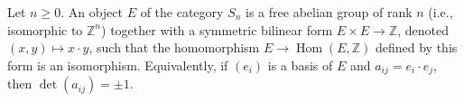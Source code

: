 Let $n \geq 0$. An object $E$ of the category $S_n$ is a free abelian group of rank $n$ (i.e., isomorphic to $\mathbb{Z}^n$) together with a symmetric bilinear form $E \times E \to \mathbb{Z}$, denoted $(x,y) \mapsto x \cdot y$, such that the homomorphism $E \to \operatorname{Hom}(E,\mathbb{Z})$ defined by this form is an isomorphism. Equivalently, if $(e_i)$ is a basis of $E$ and $a_{ij} = e_i \cdot e_j$, then $\det(a_{ij}) = \pm 1$.
